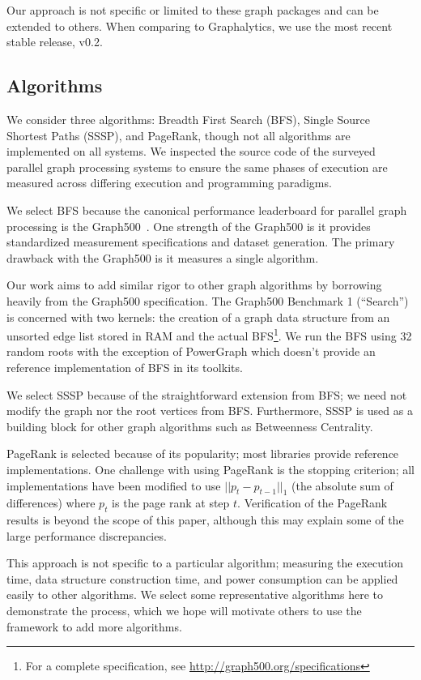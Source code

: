 \documentclass[conference]{IEEEtran}
\begin{document}
Our approach is not specific or limited to these graph packages and can be extended to others. When comparing to Graphalytics, we use the most recent stable release, v0.2.

\subsection{Algorithms}\label{sec:algs}

We consider three algorithms: Breadth First Search (BFS), Single Source Shortest Paths (SSSP), and PageRank, though not all algorithms are implemented on all systems. We inspected the source code of the surveyed parallel graph processing systems to ensure the same phases of execution are measured across differing execution and programming paradigms. 

We select BFS because the canonical performance leaderboard for parallel graph processing is the Graph500~\cite{Murphy:2010:Graph500}. One strength of the Graph500 is it provides standardized measurement specifications and dataset generation. The primary drawback with the Graph500 is it measures a single algorithm.

Our work aims to add similar rigor to other graph algorithms by borrowing heavily from the Graph500 specification. The Graph500 Benchmark 1 (``Search'') is concerned with two kernels: the creation of a graph data structure from an unsorted edge list stored in RAM and the actual BFS\footnote{For a complete specification, see \url{http://graph500.org/specifications}}. We run the BFS using 32 random roots with the exception of PowerGraph which doesn't provide an reference implementation of BFS in its toolkits.

We select SSSP because of the straightforward extension from BFS; we need not modify the graph nor the root vertices from BFS. Furthermore, SSSP is used as a building block for other graph algorithms such as Betweenness Centrality.

PageRank is selected because of its popularity; most libraries provide reference implementations. One challenge with using PageRank is the stopping criterion; all implementations have been modified to use $|| p_t - p_{t-1}||_1$ (the absolute sum of differences) where $p_t$ is the page rank at step $t$. Verification of the PageRank results is beyond the scope of this paper, although this may explain some of the large performance discrepancies.

This approach is not specific to a particular algorithm; measuring the execution time, data structure construction time, and power consumption can be applied easily to other algorithms. We select some representative algorithms here to demonstrate the process, which we hope will motivate others to use
the framework to add more algorithms.
\end{document}
